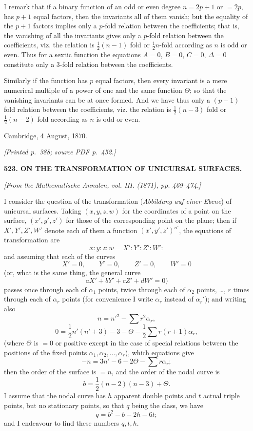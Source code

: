 \documentclass[11pt,a4paper]{article}
\newcommand{\sourcepage}[2]{\par\smallskip\noindent\textit{[Printed p.~#1; source PDF p.~#2.]}\par\smallskip}
\newcommand{\articlenote}[1]{\begin{center}\small\textit{#1}\end{center}}
\begin{document}
I remark that if a binary function of an odd or even degree $n=2p+1$ or $=2p$, has
$p+1$ equal factors, then the invariants all of them vanish; but the equality of the
$p+1$ factors implies only a $p$-fold relation between the coefficients; that is, the
vanishing of all the invariants gives only a $p$-fold relation between the coefficients,
viz. the relation is $\frac12(n-1)$ fold or $\frac12 n$-fold according as $n$ is odd or even.
Thus for a sextic function the equations $A=0$, $B=0$, $C=0$, $\Delta=0$ constitute
only a 3-fold relation between the coefficients.

Similarly if the function has $p$ equal factors, then every invariant is a mere numerical
multiple of a power of one and the same function $\Theta$; so that the vanishing
invariants can be at once formed. And we have thus only a $(p-1)$ fold relation
between the coefficients, viz. the relation is $\frac12(n-3)$ fold or $\frac12(n-2)$ fold
according as $n$ is odd or even.

\begin{flushright}
Cambridge, 4 August, 1870.
\end{flushright}

\sourcepage{388}{452}
\begin{center}
{\large\bfseries 523. ON THE TRANSFORMATION OF UNICURSAL SURFACES.}
\end{center}
\articlenote{[From the Mathematische Annalen, vol. III. (1871), pp. 469--474.]}

I consider the question of the transformation (\textit{Abbildung auf einer Ebene}) of
unicursal surfaces. Taking $(x,y,z,w)$ for the coordinates of a point on the surface,
$(x',y',z')$ for those of the corresponding point on the plane; then if
$X',Y',Z',W'$ denote each of them a function $(x',y',z')^{n'}$, the equations of
transformation are
\[
x:y:z:w=X':Y':Z':W':
\]
and assuming that each of the curves
\[
X'=0,\qquad Y'=0,\qquad Z'=0,\qquad W'=0
\]
(or, what is the same thing, the general curve
\[
aX'+bY'+cZ'+dW'=0)
\]
passes once through each of $\alpha_1$ points, twice through each of $\alpha_2$ points,
\ldots, $r$ times through each of $\alpha_r$ points (for convenience I write
$\alpha_r$ instead of $\alpha_r'$); and writing also
\[
n=n'^2-\sum r^2\alpha_r,
\]
\[
0=\frac12 n'(n'+3)-3-\Theta-\frac12\sum r(r+1)\alpha_r,
\]
(where $\Theta$ is $=0$ or positive except in the case of special relations between the
positions of the fixed points $\alpha_1,\alpha_2,\ldots,\alpha_r$), which equations give
\[
-n=3n'-6-2\Theta-\sum r\alpha_r;
\]
then the order of the surface is $=n$, and the order of the nodal curve is
\[
b=\frac12(n-2)(n-3)+\Theta.
\]
I assume that the nodal curve has $h$ apparent double points and $t$ actual triple
points, but no stationary points, so that $q$ being the class, we have
\[
q=b^2-b-2h-6t;
\]
and I endeavour to find these numbers $q,t,h$.
\end{document}
